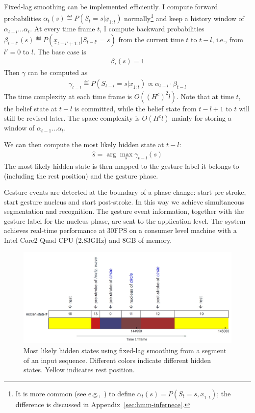 Fixed-lag smoothing can be implemented efficiently. I compute forward
probabilities $\alpha_t(s) \eqdef P(S_t = s|\underline{x}_{1:t})$
normally\footnote{It is more common (see e.g.,~\cite{Rabiner90}) to define
$\alpha_t(s) = P(S_t = s, \underline{x}_{1:t})$; the difference is discussed in
Appendix~\ref{sec:hmm-infernece}.} and keep a history window of
$\alpha_{t - l}\ldots\alpha_t$.
At every time frame $t$, I compute backward probabilities
$\beta_{t-l'}(s)\eqdef P(\underline{x}_{t-l'+1:t}|S_{t-l'}=s)$ from the current time $t$ to $t - l$,
i.e., from $l' = 0$ to $l$. The base case is 
\begin{align}
\beta_t(s) = 1
\end{align}
Then $\gamma$ can be computed as
\begin{align}
\gamma_{t - l} \eqdef P(S_{t-l}=s|\underline{x}_{1:t}) \propto \alpha_{t -
l}\cdot\beta_{t - l}
\end{align}  
The time complexity at each time frame is $O((H^c)^2l)$. Note that at time $t$,
the belief state at $t - l$ is committed, while the belief state from $t - l + 1$ to $t$
will still be revised later. The space complexity is $O(H^cl)$ mainly for
storing a window of $\alpha_{t-1}\ldots\alpha_{t}$.

We can then compute the most likely hidden state at $t - l$:
\begin{align}
\hat{s} = \arg\max_s \gamma_{t - l}(s)
\end{align}
The most likely hidden state is then mapped to the gesture label it
belongs to (including the rest position) and the gesture phase. 

Gesture events are detected at the boundary of a phase change: start pre-stroke,
start gesture nucleus and start post-stroke. In this way
we achieve simultaneous segmentation and recognition. The gesture event
information, together with the gesture label for the nucleus phase, are sent to the application level.
The system achieves real-time performance at 30FPS on a consumer level machine
with a Intel Core2 Quad CPU (2.83GHz) and 8GB of memory.

\begin{figure}[t]
\centering
\includegraphics[trim=0 0 0
5mm, clip, width=\columnwidth]{figures/hidden_labeled.jpg}
\caption{Most likely hidden states using fixed-lag smoothing from a segment of
an input sequence.
Different colors indicate different hidden states. Yellow indicates rest position.}
\label{fig:visual_hidden}
\end{figure}

